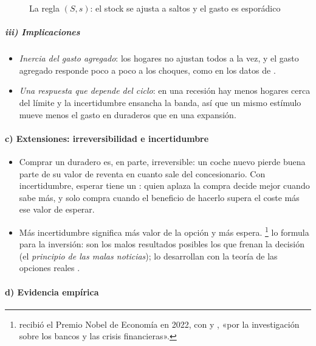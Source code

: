 \documentclass[11pt]{article}
\begin{document}
\begin{figure}[H]
\centering
\caption{La regla $(S,s)$: el stock se ajusta a saltos y el gasto es esporádico}\label{fig:duraderos-ss}
\end{figure}

\subparagraph{iii) Implicaciones}

\begin{itemize}
\item \emph{Inercia del gasto agregado}: los hogares no ajustan todos a la vez, y el gasto agregado responde poco a poco a los choques, como en los datos de \nocite{Caballero1993Durable}.
\item \emph{Una respuesta que depende del ciclo}: en una recesión hay menos hogares cerca del límite y la incertidumbre ensancha la banda, así que un mismo estímulo mueve menos el gasto en duraderos que en una expansión\nocite{BergerVavra2015}.
\end{itemize}

\paragraph{c) Extensiones: irreversibilidad e incertidumbre}

\begin{itemize}
\item Comprar un duradero es, en parte, irreversible: un coche nuevo pierde buena parte de su valor de reventa en cuanto sale del concesionario. Con incertidumbre, esperar tiene un : quien aplaza la compra decide mejor cuando sabe más, y solo compra cuando el beneficio de hacerlo supera el coste más ese valor de esperar.
\item Más incertidumbre significa más valor de la opción y más espera. \textcite{Bernanke1983Irreversibility}\footnote{ recibió el Premio Nobel de Economía en 2022, con  y , «por la investigación sobre los bancos y las crisis financieras»\nocite{Nobel2022}.} lo formula para la inversión: son los malos resultados posibles los que frenan la decisión (el \emph{principio de las malas noticias}); \textcite{DixitPindyck1994} lo desarrollan con la teoría de las opciones reales .
\end{itemize}

\paragraph{d) Evidencia empírica}
\end{document}
